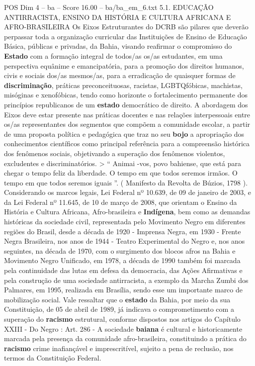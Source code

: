 \begin{textsample}{POS Dim 4 – ba – Score 16.00 – ba/ba\_em\_6.txt}  \label{ex:f4_pos_028}
5.1.
EDUCAÇÃO ANTIRRACISTA, ENSINO DA HISTÓRIA E CULTURA AFRICANA E AFRO-BRASILEIRA Os Eixos Estruturantes do DCRB são pilares que deverão perpassar toda a organização curricular das Instituições de Ensino de Educação Básica, públicas e privadas, da Bahia, visando reafirmar o compromisso do \textbf{Estado} com a formação integral de todos/as os/as estudantes, em uma perspectiva equânime e emancipatória, para a promoção dos direitos humanos, civis e sociais dos/as mesmos/as, para a erradicação de quaisquer formas de \textbf{discriminação}, práticas preconceituosas, racistas, LGBTQfóbicas, machistas, misóginas e xenofóbicas, tendo como horizonte o fortalecimento permanente dos princípios republicanos de um \textbf{estado} democrático de direito.
A abordagem dos Eixos deve estar presente nas práticas docentes e nas relações interpessoais entre os/as representantes dos segmentos que compõem a comunidade escolar, a partir de uma proposta política e pedagógica que traz no seu \textbf{bojo} a apropriação dos conhecimentos científicos como principal referência para a compreensão histórica dos fenômenos sociais, objetivando a superação dos fenômenos violentos, excludentes e discriminatórios. > “ Animai -vos, povo bahiense, que está para chegar o tempo feliz da liberdade.
O tempo em que todos seremos irmãos.
O tempo em que todos seremos iguais ”. ( Manifesto da Revolta de Búzios, 1798 ).
Considerando os marcos legais, Lei Federal nº 10.639, de 09 de janeiro de 2003, e da Lei Federal nº 11.645, de 10 de março de 2008, que orientam o Ensino da História e Cultura Africana, Afro-brasileira e \textbf{Indígena}, bem como as demandas históricas da sociedade civil, representada pelo Movimento Negro em diferentes regiões do Brasil, desde a década de 1920 - Imprensa Negra, em 1930 - Frente Negra Brasileira, nos anos de 1944 - Teatro Experimental do Negro e, nos anos seguintes, na década de 1970, com o surgimento dos blocos afros na Bahia e Movimento Negro Unificado, em 1978, a década de 1990 também foi marcada pela continuidade das lutas em defesa da democracia, das Ações Afirmativas e pela construção de uma sociedade antirracista, a exemplo da Marcha Zumbi dos Palmares, em 1995, realizada em Brasília, sendo esse um importante marco de mobilização social.
Vale ressaltar que o \textbf{estado} da Bahia, por meio da sua Constituição, de 05 de abril de 1989, já indicava o comprometimento com a superação do \textbf{racismo} estrutural, conforme dispostos nos artigos do Capítulo XXIII - Do Negro : Art. 286 - A sociedade \textbf{baiana} é cultural e historicamente marcada pela presença da comunidade afro-brasileira, constituindo a prática do \textbf{racismo} crime inafiançável e imprescritível, sujeito a pena de reclusão, nos termos da Constituição Federal.

\end{textsample}

